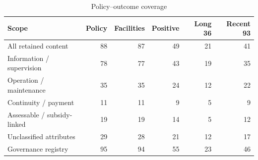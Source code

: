 \begin{table}[htbp]\centering\small
\caption{Policy--outcome coverage}\label{tab:si_overlap}
\begin{tabular}{@{}p{.34\linewidth}rrrrr@{}}
\toprule
Scope & Policy & Facilities & Positive & Long 36 & Recent 93\\\midrule
All retained content & 88 & 87 & 49 & 21 & 41\\
Information / supervision & 78 & 77 & 43 & 19 & 35\\
Operation / maintenance & 35 & 35 & 24 & 12 & 22\\
Continuity / payment & 11 & 11 & 9 & 5 & 9\\
Assessable / subsidy-linked & 19 & 19 & 14 & 5 & 12\\
Unclassified attributes & 29 & 28 & 21 & 12 & 17\\
Governance registry & 95 & 94 & 55 & 23 & 46\\
\bottomrule\end{tabular}
\end{table}
